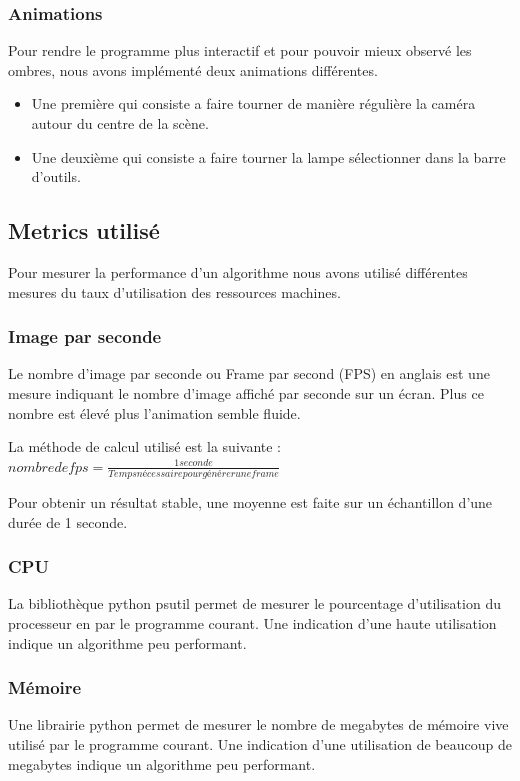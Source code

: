 \documentclass[a4paper,10pt]{report}
\begin{document}
\subsubsection{Animations}

Pour rendre le programme plus interactif et pour pouvoir mieux observé les ombres, nous avons implémenté deux animations différentes.


\begin{itemize}
  \item Une première qui consiste a faire tourner de manière régulière la caméra autour du centre de la scène.
  \item Une deuxième qui consiste a faire tourner la lampe sélectionner dans la barre d'outils.
\end{itemize}


\subsection{Metrics utilisé}

Pour mesurer la performance d'un algorithme nous avons utilisé différentes mesures du taux d'utilisation des ressources machines.
\subsubsection{Image par seconde}
Le nombre d'image par seconde ou Frame par second (FPS) en anglais est une mesure indiquant le nombre d'image affiché par seconde sur un écran. Plus ce nombre est élevé plus l'animation semble fluide.

La méthode de calcul utilisé est la suivante : $nombre de fps = \frac{1 seconde}{Temps  nécessaire pour générer une frame}$

Pour obtenir un résultat stable, une moyenne est faite sur un échantillon d'une durée de 1 seconde.

\subsubsection{CPU}
La bibliothèque python psutil permet de mesurer le pourcentage d'utilisation du processeur en par le programme courant. Une indication d'une haute utilisation indique un algorithme peu performant.
\subsubsection{Mémoire}

Une librairie python permet de mesurer le nombre de megabytes de mémoire vive utilisé par le programme courant. Une indication d'une utilisation de beaucoup de megabytes indique un algorithme peu performant.
\end{document}
